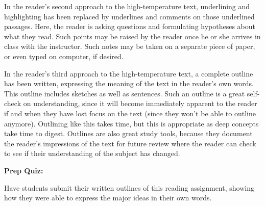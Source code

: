 \vskip 10pt

In the reader's second approach to the high-temperature text, underlining and highlighting has been replaced by underlines and comments on those underlined passages.  Here, the reader is asking questions and formulating hypotheses about what they read.  Such points may be raised by the reader once he or she arrives in class with the instructor.  Such notes may be taken on a separate piece of paper, or even typed on computer, if desired.

\vskip 10pt

In the reader's third approach to the high-temperature text, a complete outline has been written, expressing the meaning of the text in the reader's own words.  This outline includes sketches as well as sentences.  Such an outline is a great self-check on understanding, since it will become immediately apparent to the reader if and when they have lost focus on the text (since they won't be able to outline anymore).  Outlining like this takes time, but this is appropriate as deep concepts take time to digest.  Outlines are also great study tools, because they document the reader's impressions of the text for future review where the reader can check to see if their understanding of the subject has changed.










\vfil \eject

\noindent
{\bf Prep Quiz:}

Have students submit their written outlines of this reading assignment, showing how they were able to express the major ideas in their own words.






